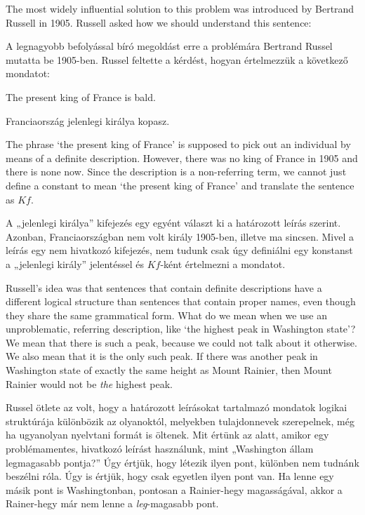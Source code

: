The most widely influential solution to this problem was introduced by Bertrand Russell in 1905. Russell asked how we should understand this sentence:

A legnagyobb befolyással bíró megoldást erre a problémára Bertrand Russel mutatta be 1905-ben. Russel feltette a kérdést, hogyan értelmezzük a következő mondatot:
\begin{earg}
\item[\ex{defdesc1}] The present king of France is bald.
\end{earg}
\begin{earg}
\item[\ex{defdesc1}] Franciaország jelenlegi királya kopasz.
\end{earg}
The phrase `the present king of France' is supposed to pick out an individual by means of a definite description. However, there was no king of France in 1905 and there is none now. Since the description is a non-referring term, we cannot just define a constant to mean `the present king of France' and translate the sentence as $Kf$.

A „jelenlegi királya” kifejezés egy egyént választ ki a határozott leírás szerint. Azonban, Franciaországban nem volt király 1905-ben, illetve ma sincsen. Mivel a leírás egy nem hivatkozó kifejezés, nem tudunk csak úgy definiálni egy konstanst a „jelenlegi király” jelentéssel és $Kf$-ként értelmezni a mondatot.

Russell's idea was that sentences that contain definite descriptions have a different logical structure than sentences that contain proper names, even though they share the same grammatical form. What do we mean when we use an unproblematic, referring description, like `the highest peak in Washington state'? We mean that there is such a peak, because we could not talk about it otherwise. We also mean that it is the only such peak. If there was another peak in Washington state of exactly the same height as Mount Rainier, then Mount Rainier would not be \emph{the} highest peak.

Russel ötlete az volt, hogy a határozott leírásokat tartalmazó mondatok logikai struktúrája különbözik az olyanoktól, melyekben tulajdonnevek szerepelnek, még ha ugyanolyan nyelvtani formát is öltenek. Mit értünk az alatt, amikor egy problémamentes, hivatkozó leírást használunk, mint „Washington állam legmagasabb pontja?” Úgy értjük, hogy létezik ilyen pont, különben nem tudnánk beszélni róla. Úgy is értjük, hogy csak egyetlen ilyen pont van. Ha lenne egy másik pont is Washingtonban, pontosan a Rainier-hegy magasságával, akkor a Rainer-hegy már nem lenne a  \emph{leg}-magasabb pont.

